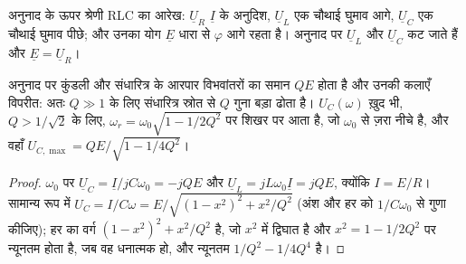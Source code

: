 \begin{omfigure}

{\small अनुनाद के ऊपर श्रेणी RLC का  आरेख: $\underline U_R$
$\underline I$ के अनुदिश, $\underline U_L$ एक चौथाई घुमाव आगे, $\underline U_C$
एक चौथाई घुमाव पीछे; और उनका योग $\underline E$ धारा से
$\varphi$ आगे रहता है। अनुनाद पर $\underline U_L$ और $\underline U_C$ कट जाते हैं और
$\underline E = \underline U_R$।}
\end{omfigure}

\begin{proposition}[विभव-आवर्धन]\label{prop:b1:sinusoidal-impedance:overvoltage}
अनुनाद पर कुंडली और संधारित्र के आरपार विभवांतरों का 
समान $QE$ होता है और उनकी कलाएँ विपरीत: अतः $Q \gg 1$ के लिए संधारित्र
स्रोत से $Q$ गुना बड़ा  ढोता है। 
$U_C(\omega)$ ख़ुद भी, $Q > 1/\sqrt2$ के लिए, $\omega_r =
\omega_0\sqrt{1 - 1/2Q^2}$ पर शिखर पर आता है, जो $\omega_0$ से ज़रा नीचे है,
और वहाँ $U_{C,\max} = QE/\sqrt{1 - 1/4Q^2}$।
\end{proposition}

\begin{proof}
$\omega_0$ पर $\underline U_C = \underline I/jC\omega_0 = -jQE$ और
$\underline U_L = jL\omega_0\underline I = jQE$, क्योंकि $I = E/R$।
सामान्य रूप में $U_C = I/C\omega = E/\sqrt{(1 - x^2)^2 + x^2/Q^2}$ (अंश और
हर को $1/C\omega_0$ से गुणा कीजिए); हर का वर्ग
$(1 - x^2)^2 + x^2/Q^2$ है, जो $x^2$ में द्विघात है और $x^2 =
1 - 1/2Q^2$ पर न्यूनतम होता है, जब वह धनात्मक हो, और न्यूनतम $1/Q^2 - 1/4Q^4$ है।
\end{proof}

